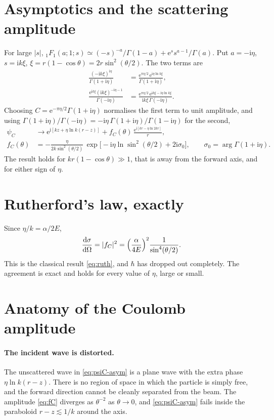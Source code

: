 \documentclass[11pt,a4paper]{book}
\numberwithin{equation}{chapter}
\newcommand{\dd}{\mathrm{d}}
\newcommand{\ii}{\mathrm{i}}
\newcommand{\ee}{\mathrm{e}}
\newcommand{\Fhyp}{{}_1F_1}
\newcommand{\dsdO}{\frac{\dd\sigma}{\dd\Omega}}
\begin{document}
\section{Asymptotics and the scattering amplitude}

For large $|s|$,
$\Fhyp(a;1;s)\simeq(-s)^{-a}/\Gamma(1-a)+\ee^{s}s^{a-1}/\Gamma(a)$. Put
$a=-\ii\eta$, $s=\ii k\xi$, $\xi=r(1-\cos\theta)=2r\sin^2(\theta/2)$. The two
terms are
\begin{align*}
  \frac{(-\ii k\xi)^{\ii\eta}}{\Gamma(1+\ii\eta)}
    &=\frac{\ee^{\pi\eta/2}\,\ee^{\ii\eta\ln k\xi}}{\Gamma(1+\ii\eta)},\\[2pt]
  \frac{\ee^{\ii k\xi}(\ii k\xi)^{-\ii\eta-1}}{\Gamma(-\ii\eta)}
    &=\frac{\ee^{\pi\eta/2}\,\ee^{\ii k\xi-\ii\eta\ln k\xi}}
           {\ii k\xi\,\Gamma(-\ii\eta)} .
\end{align*}
Choosing $C=\ee^{-\pi\eta/2}\Gamma(1+\ii\eta)$ normalises the first term to unit
amplitude, and using
$\Gamma(1+\ii\eta)/\Gamma(-\ii\eta)=-\ii\eta\,\Gamma(1+\ii\eta)/\Gamma(1-\ii\eta)$
for the second,
\begin{align}
  \psi_C&\to \ee^{\ii[kz+\eta\ln k(r-z)]}
        +f_C(\theta)\,\frac{\ee^{\ii[kr-\eta\ln2kr]}}{r}, \label{eq:psiC-asym}\\[4pt]
  f_C(\theta)&=-\frac{\eta}{2k\sin^2(\theta/2)}\,
        \exp\!\bigl[-\ii\eta\ln\sin^2(\theta/2)+2\ii\sigma_0\bigr],
        \qquad \sigma_0=\arg\Gamma(1+\ii\eta). \label{eq:fC}
\end{align}
The result holds for $kr(1-\cos\theta)\gg1$, that is away from the forward axis,
and for either sign of $\eta$.

\section{Rutherford's law, exactly}

Since $\eta/k=\alpha/2E$,
\begin{equation}\label{eq:ruth-q}
  \dsdO=|f_C|^2=\Bigl(\frac{\alpha}{4E}\Bigr)^{2}\frac1{\sin^4(\theta/2)} .
\end{equation}
This is the classical result \eqref{eq:ruth}, and $\hbar$ has dropped out
completely. The agreement is exact and holds for every value of $\eta$, large
or small.

\section{Anatomy of the Coulomb amplitude}

\paragraph{The incident wave is distorted.} The unscattered wave in
\eqref{eq:psiC-asym} is a plane wave with the extra phase $\eta\ln k(r-z)$.
There is no region of space in which the particle is simply free, and the
forward direction cannot be cleanly separated from the beam. The amplitude
\eqref{eq:fC} diverges as $\theta^{-2}$ as $\theta\to0$, and
\eqref{eq:psiC-asym} fails inside the paraboloid $r-z\lesssim1/k$ around the
axis.
\end{document}

